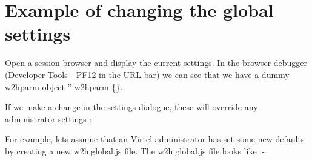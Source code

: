 \documentclass[letterpaper,10pt,english]{sphinxmanual}
\begin{document}


\section{Example of changing the global settings}
\label{\detokenize{TN202002:example-of-changing-the-global-settings}}
Open a session browser and display the current settings. In the browser debugger (Developer Tools - PF12 in the URL bar) we can see that we have a dummy w2hparm object ” w2hparm  \{\}.


If we make a change in the settings dialogue, these will override any administrator settings :-


For example, lets assume that an Virtel administrator has set some new defaults by creating a new w2h.global.js file. The w2h.global.js file looks like :-

\begin{sphinxVerbatim}[commandchars=\\\{\}]
  
          
   
\end{sphinxVerbatim}
\end{document}
